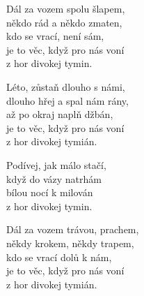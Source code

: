 
\ve{}
Dál za vozem spolu šlapem,\\
někdo rád a někdo zmaten,\\
kdo se vrací, není sám,\\
je to věc, když pro nás voní\\
z hor divokej tymin. 

\ve{}
Léto, zůstaň dlouho s námi,\\
dlouho hřej a spal nám rány,\\
až po okraj naplň džbán,\\
je to věc, když pro nás voní\\
z hor divokej tymián.

\cho{}
Podívej, jak málo stačí,\\
když do vázy natrhám\\
bílou nocí k milován\\
z hor divokej tymin.

\ve{}
Dál za vozem trávou, prachem,\\
někdy krokem, někdy trapem,\\
kdo se vrací dolů k nám,\\
je to věc, když pro nás voní\\
z hor divokej tymián.

\cho{}

\esong
